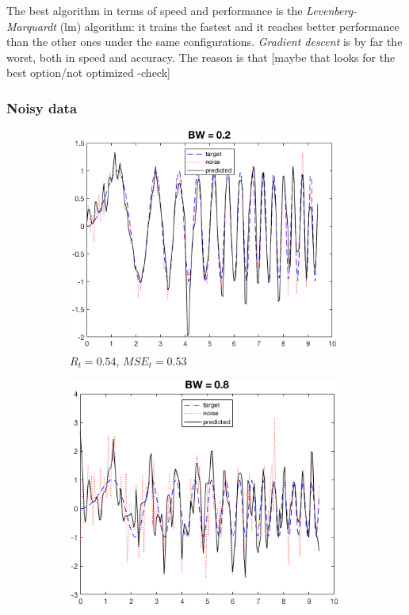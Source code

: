 \documentclass[a4paper, 10pt]{article}
\begin{document}
  The best algorithm
  in terms of speed and performance is the \emph{Levenberg-Marquardt} (lm)
  algorithm: it trains the fastest and it reaches better performance
  than the other ones under the same configurations. \emph{Gradient descent}
  is by far the worst, both in speed and accuracy. The reason is that [maybe 
  that looks for the best option/not optimized -check]

  \subsubsection{Noisy data}
    \begin{figure}[h]
      \begin{adjustwidth}{-1.1cm}{-1.1cm}
      \centering
      \begin{subfigure}[t]{0.31\linewidth}
        \includegraphics[width=1\linewidth]{./lab1/noise_2e-1.png}
        \caption{$R_t=0.54$, $MSE_t=0.53$}
        \label{fig:noise_small}
      \end{subfigure}
      \begin{subfigure}[t]{0.30\linewidth}
        \includegraphics[width=1\linewidth]{./lab1/noise_8e-1.png}

\end{subfigure}
\end{adjustwidth}
\end{figure}
\end{document}
